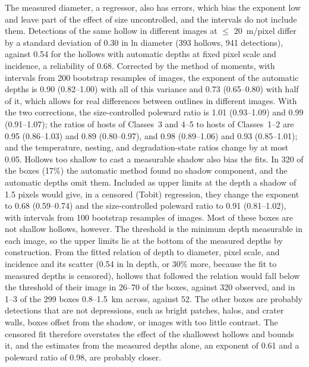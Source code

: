 \documentclass{planetary}
\begin{document}
The measured diameter, a regressor, also has errors, which bias the exponent low and leave part of the effect of size uncontrolled, and the intervals do not include them. Detections of the same hollow in different images at $\leq$ 20~m/pixel differ by a standard deviation of 0.30 in ln diameter (393 hollows, 941 detections), against 0.54 for the hollows with automatic depths at fixed pixel scale and incidence, a reliability of 0.68. Corrected by the method of moments, with intervals from 200 bootstrap resamples of images, the exponent of the automatic depths is 0.90 (0.82--1.00) with all of this variance and 0.73 (0.65--0.80) with half of it, which allows for real differences between outlines in different images. With the two corrections, the size-controlled poleward ratio is 1.01 (0.93--1.09) and 0.99 (0.91--1.07); the ratios of hosts of Classes~3 and 4--5 to hosts of Classes~1--2 are 0.95 (0.86--1.03) and 0.89 (0.80--0.97), and 0.98 (0.89--1.06) and 0.93 (0.85--1.01); and the temperature, nesting, and degradation-state ratios change by at most 0.05. Hollows too shallow to cast a measurable shadow also bias the fits. In 320 of the boxes (17\%) the automatic method found no shadow component, and the automatic depths omit them. Included as upper limits at the depth a shadow of 1.5 pixels would give, in a censored (Tobit) regression, they change the exponent to 0.68 (0.59--0.74) and the size-controlled poleward ratio to 0.91 (0.81--1.02), with intervals from 100 bootstrap resamples of images. Most of these boxes are not shallow hollows, however. The threshold is the minimum depth measurable in each image, so the upper limits lie at the bottom of the measured depths by construction. From the fitted relation of depth to diameter, pixel scale, and incidence and its scatter (0.54 in ln depth, or 30\% more, because the fit to measured depths is censored), hollows that followed the relation would fall below the threshold of their image in 26--70 of the boxes, against 320 observed, and in 1--3 of the 299 boxes 0.8--1.5~km across, against 52. The other boxes are probably detections that are not depressions, such as bright patches, halos, and crater walls, boxes offset from the shadow, or images with too little contrast. The censored fit therefore overstates the effect of the shallowest hollows and bounds it, and the estimates from the measured depths alone, an exponent of 0.61 and a poleward ratio of 0.98, are probably closer.
\end{document}
